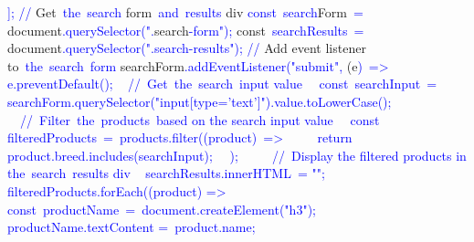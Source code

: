 \documentclass{article}
\begin{document}
\begin{tcolorbox}[colframe=black,colback=white]
{}\textcolor{blue}{];
}\textcolor{blue}{//} Get\textcolor{blue}{~the}\textcolor{blue}{~search} form\textcolor{blue}{~and}\textcolor{blue}{~results} div\textcolor{blue}{
}\textcolor{blue}{const}\textcolor{blue}{~search}Form\textcolor{blue}{~=} document\textcolor{blue}{.querySelector}\textcolor{blue}{(".}search\textcolor{blue}{-form}\textcolor{blue}{");
}const\textcolor{blue}{~search}\textcolor{blue}{Results}\textcolor{blue}{~=} document\textcolor{blue}{.querySelector}\textcolor{blue}{(".}\textcolor{blue}{search}\textcolor{blue}{-results}\textcolor{blue}{");
}\textcolor{blue}{//} Add event listener to\textcolor{blue}{~the}\textcolor{blue}{~search}\textcolor{blue}{~form}\textcolor{blue}{
}searchForm\textcolor{blue}{.addEventListener}\textcolor{blue}{("}\textcolor{blue}{submit}\textcolor{blue}{",} (e\textcolor{blue}{)}\textcolor{blue}{~=>}\textcolor{blue}{~{
}\textcolor{blue}{~} e.preventDefault\textcolor{blue}{();
}  
\textcolor{blue}{~} //\textcolor{blue}{~Get}\textcolor{blue}{~the}\textcolor{blue}{~search}\textcolor{blue}{~input} value\textcolor{blue}{
}\textcolor{blue}{~}\textcolor{blue}{~const}\textcolor{blue}{~search}Input\textcolor{blue}{~=} searchForm\textcolor{blue}{.querySelector}\textcolor{blue}{("}input\textcolor{blue}{[type}\textcolor{blue}{='}\textcolor{blue}{text}']").value\textcolor{blue}{.toLowerCase}\textcolor{blue}{();
}  
\textcolor{blue}{~}\textcolor{blue}{~//}\textcolor{blue}{~Filter}\textcolor{blue}{~the}\textcolor{blue}{~products}\textcolor{blue}{~based} on the search input value
\textcolor{blue}{~}\textcolor{blue}{~const} filtered\textcolor{blue}{Products}\textcolor{blue}{~=}\textcolor{blue}{~products}\textcolor{blue}{.filter}((\textcolor{blue}{product}\textcolor{blue}{)}\textcolor{blue}{~=>}\textcolor{blue}{~{
}\textcolor{blue}{~~~} return product\textcolor{blue}{.b}\textcolor{blue}{reed}\textcolor{blue}{.includes}\textcolor{blue}{(search}Input\textcolor{blue}{);
}\textcolor{blue}{~}\textcolor{blue}{~});
}\textcolor{blue}{~~
}\textcolor{blue}{~}\textcolor{blue}{~//}\textcolor{blue}{~Display} the filtered products in the\textcolor{blue}{~search}\textcolor{blue}{~results} div\textcolor{blue}{
}\textcolor{blue}{~} searchResults.innerHTML\textcolor{blue}{~=} "";
  filtered\textcolor{blue}{Products}.forEach\textcolor{blue}{((}product\textcolor{blue}{)} =>\textcolor{blue}{~{
}\textcolor{blue}{~~~} const\textcolor{blue}{~productName}\textcolor{blue}{~=}\textcolor{blue}{~document}.createElement\textcolor{blue}{("}h\textcolor{blue}{3}\textcolor{blue}{");
}\textcolor{blue}{~~~} productName.textContent =\textcolor{blue}{~product}\textcolor{blue}{.name}\textcolor{blue}{;
}}}
\end{tcolorbox}
\end{document}
